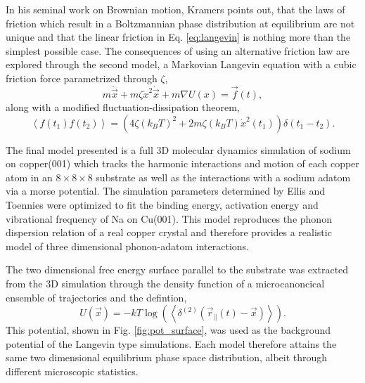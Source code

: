 \documentclass[7pt]{article}
\begin{document}
In his seminal work on Brownian motion, Kramers points out, that the laws of friction which result in a Boltzmannian phase distribution at equilibrium are not unique and that the linear friction in Eq. \ref{eq:langevin} is nothing more than the simplest possible case\cite{Kramers}. The consequences of using an alternative friction law are explored through the second model, a Markovian Langevin equation with a cubic friction force parametrized through $\zeta$,
$$
m\ddot{\vec{x}} + m\zeta\dot{x}^2\dot{\vec{x}} + m \nabla U(x) = \vec{f}(t),
$$
along with a modified fluctuation-dissipation theorem\cite{Kramers},
$$\left<f(t_1)f(t_2)\right>=\left(4\zeta\left(k_BT\right)^2 + 2 m \zeta \left(k_BT\right)\dot{x}^2(t_1)\right)\delta\left(t_1-t_2\right).$$

The final model presented is a full 3D molecular dynamics simulation of sodium on copper(001) which tracks the harmonic interactions and motion of each copper atom in an $8\times8\times8$ substrate as well as the interactions with a sodium adatom via a morse potential. The simulation parameters determined by Ellis and Toennies\cite{Ellis} were optimized to fit the binding energy, activation energy and vibrational frequency of Na on Cu(001). This model reproduces the phonon dispersion relation of a real copper crystal\cite{Sinha} and therefore provides a realistic model of three dimensional phonon-adatom interactions.

The two dimensional free energy surface parallel to the substrate was extracted from the 3D simulation through the density function of a microcanoncical ensemble of trajectories and the defintion,
$$U(\vec{x}) = -kT\log\left(\left<\delta^{(2)}(\vec{r}_{\parallel}(t) - \vec{x})\right>\right).$$
This potential, shown in Fig. \ref{fig:pot_surface}, was used as the background potential of the Langevin type simulations. Each model therefore attains the same two dimensional equilibrium phase space distribution, albeit through different microscopic statistics. 
\end{document}
